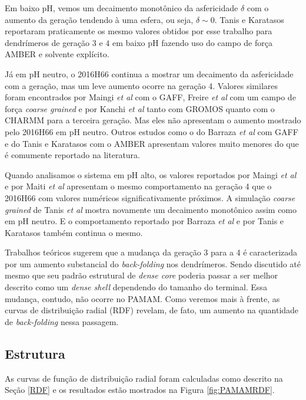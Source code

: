 Em baixo pH, vemos um decaimento monotônico da asfericidade $\delta$ com o aumento da geração tendendo à uma esfera, ou seja, $\delta \sim 0$. 
Tanis e Karatasos\cite{Tanis2009} reportaram praticamente os mesmo valores obtidos por esse trabalho para dendrímeros de geração $3$ e $4$ em baixo pH fazendo uso do campo de força AMBER\cite{Weiner1984} e solvente explícito.

Já em pH neutro, o 2016H66 continua a mostrar um decaimento da asfericidade com a geração, mas um leve aumento ocorre na geração 4.
Valores similares foram encontrados por Maingi \textit{et al}\cite{Maingi2012} com o GAFF, Freire \textit{et al}\cite{Freire2016} com um campo de força \textit{coarse grained} e por Kanchi \textit{et al}\cite{Kanchi2018} tanto com GROMOS quanto com o CHARMM para a terceira geração.
Mas eles não apresentam o aumento mostrado pelo 2016H66\cite{Horta2016} em pH neutro.
Outros estudos como o do Barraza \textit{et al}\cite{Barraza2017} com GAFF e do Tanis e Karatasos\cite{Tanis2009} com o AMBER\cite{Weiner1984} apresentam valores muito menores do que é comumente reportado na literatura.

Quando analisamos o sistema em pH alto, os valores reportados por Maingi \textit{et al}\cite{Maingi2012} e por Maiti \textit{et al}\cite{Maiti2004} apresentam o mesmo comportamento na geração 4 que o 2016H66\cite{Horta2016} com valores numéricos significativamente próximos.
A simulação \textit{coarse grained} de Tanis \textit{et al}\cite{Tanis2009} mostra novamente um decaimento monotônico assim como em pH neutro.
E o comportamento reportado por Barraza \textit{et al}\cite{Barraza2017} e por Tanis e Karatasos\cite{Tanis2009} também continua o mesmo.

Trabalhos teóricos sugerem que a mudança da geração 3 para a 4 é caracterizada por um aumento substancial do \textit{back-folding} nos dendrímeros.
Sendo discutido até mesmo que seu padrão estrutural de \textit{dense core} poderia passar a ser melhor descrito como um \textit{dense shell} dependendo do tamanho do terminal.
Essa mudança, contudo, não ocorre no PAMAM.
Como veremos mais à frente, as curvas de distribuição radial (RDF) revelam, de fato, um aumento na quantidade de \textit{back-folding} nessa passagem.

\subsection{Estrutura}\label{PAMAMEstrutura}

As curvas de função de distribuição radial foram calculadas como descrito na Seção \ref{RDF} e os resultados estão mostrados na Figura \ref{fig:PAMAMRDF}.

